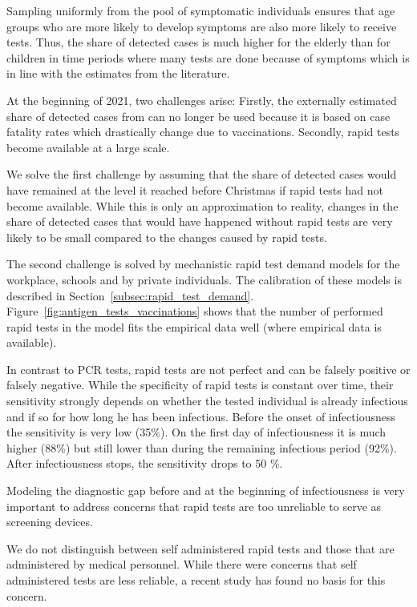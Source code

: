 Sampling uniformly from the pool of symptomatic individuals ensures that age groups who
are more likely to develop symptoms are also more likely to receive tests. Thus, the
share of detected cases is much higher for the elderly than for children in time periods
where many tests are done because of symptoms which is in line with the estimates from
the literature. 

At the beginning of 2021, two challenges arise: Firstly, the externally estimated share
of detected cases from \citet{Dunkelzifferradar2020} can no longer be used because it is based on
case fatality rates which drastically change due to vaccinations. Secondly, rapid tests
become available at a large scale.

We solve the first challenge by assuming that the share of detected cases would have
remained at the level it reached before Christmas if rapid tests had not become
available. While this is only an approximation to reality, changes in the share of
detected cases that would have happened without rapid tests are very likely to be small
compared to the changes caused by rapid tests.

The second challenge is solved by mechanistic rapid test demand models for the workplace,
schools and by private individuals. The calibration of these models is described in
Section~\ref{subsec:rapid_test_demand}. Figure~\ref{fig:antigen_tests_vaccinations} shows
that the number of performed rapid tests in the model fits the empirical data well (where
empirical data is available).

In contrast to PCR tests, rapid tests are not perfect and can be falsely positive or
falsely negative. While the specificity of rapid tests is constant over time, their
sensitivity strongly depends on whether the tested individual is already infectious and
if so for how long he has been infectious. Before the onset of infectiousness the
sensitivity is very low (35\%). On the first day of infectiousness it is much higher
(88\%) but still lower than during the remaining infectious period (92\%). After
infectiousness stops, the sensitivity drops to 50 \%.

Modeling the diagnostic gap before and at the beginning of infectiousness is very
important to address concerns that rapid tests are too unreliable to serve as screening
devices.

We do not distinguish between self administered rapid tests and those that are
administered by medical personnel. While there were concerns that self administered tests
are less reliable, a recent study has found no basis for this concern.

